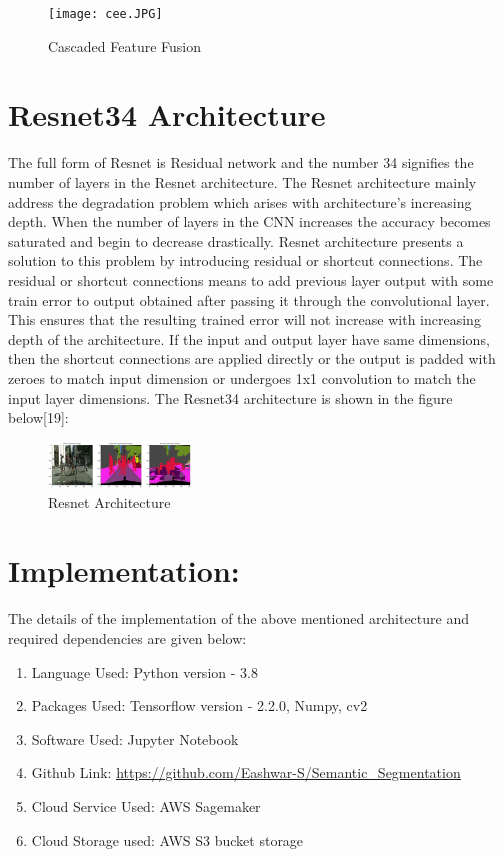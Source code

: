 \documentclass{IEEEtran}
\begin{document}
\begin{figure}[h]
    \centering
    \captionsetup{justification=centering}
    \texttt{[image: cee.JPG]}
    \caption{Cascaded Feature Fusion}
    \label{fig:Binary class segmented output}
\end{figure}

\section{\textbf{Resnet34 Architecture}}
The full form of Resnet is Residual network and the number 34 signifies the number of layers in the Resnet architecture. The Resnet architecture mainly address the degradation problem which arises with architecture's increasing depth. When the number of layers in the CNN increases the accuracy becomes saturated and begin to decrease drastically. Resnet architecture presents a solution to this problem by introducing residual or shortcut connections. The residual or shortcut connections means to add previous layer output with some train error to output obtained after passing it through the convolutional layer. This ensures that the resulting trained error will not increase with increasing depth of the architecture. If the input and output layer have same dimensions, then the shortcut connections are applied directly or the output is padded with zeroes to match input dimension or undergoes 1x1 convolution to match the input layer dimensions. The Resnet34 architecture is shown in the figure below[19]: 

\newpage
\begin{figure}[h]
    \centering
    \captionsetup{justification=centering}
    \includegraphics[width=3.8cm]{resnet.JPG}
    \caption{Resnet Architecture}
    \label{fig:Binary class segmented output}
\end{figure}

\section{\textbf{Implementation:}}
The details of the implementation of the above mentioned architecture and required dependencies are given below:
\begin{enumerate}
\item Language Used: Python version - 3.8

\item Packages Used: Tensorflow version - 2.2.0, Numpy, cv2

\item Software Used: Jupyter Notebook

\item Github Link: \textcolor{blue}{\underline{\url{https://github.com/Eashwar-S/Semantic_Segmentation}}}

\item Cloud Service Used: AWS Sagemaker

\item Cloud Storage used: AWS S3 bucket storage

\end{enumerate}
\end{document}
